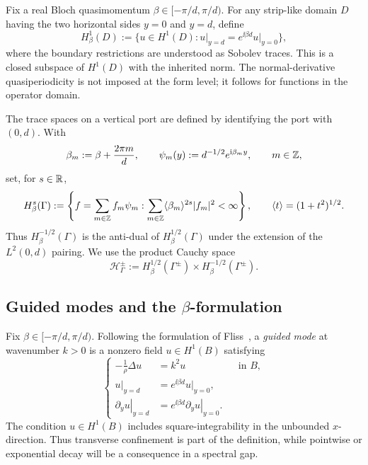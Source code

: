 Fix a real Bloch quasimomentum $\beta\in[-\pi/d,\pi/d)$.  For any strip-like
domain $D$ having the two horizontal sides $y=0$ and $y=d$, define
\begin{equation}
  H^1_\beta(D):=
  \bigl\{u\in H^1(D):
  \left.u\right|_{y=d}
  =e^{\ii\beta d}\left.u\right|_{y=0}\bigr\},
  \label{eq:H1beta}
\end{equation}
where the boundary restrictions are understood as Sobolev traces.  This is a
closed subspace of $H^1(D)$ with the inherited norm.  The normal-derivative
quasiperiodicity is not imposed at the form level; it follows for functions in
the operator domain.

The trace spaces on a vertical port are defined by identifying the port with
$(0,d)$.  With
\[
  \beta_m:=\beta+\frac{2\pi m}{d},\qquad
  \psi_m(y):=d^{-1/2}e^{\mathrm{i}\beta_my},\qquad m\in\mathbb{Z},
\]
set, for $s\in\mathbb{R}$,
\begin{equation}
  H^s_\beta(\Gamma):=
  \left\{f=\sum_{m\in\mathbb{Z}}f_m\psi_m:
  \sum_{m\in\mathbb{Z}}\langle\beta_m\rangle^{2s}|f_m|^2<\infty\right\},
  \qquad \langle t\rangle=(1+t^2)^{1/2}.
  \label{eq:port-Sobolev}
\end{equation}
Thus $H^{-1/2}_\beta(\Gamma)$ is the anti-dual of
$H^{1/2}_\beta(\Gamma)$ under the extension of the $L^2(0,d)$ pairing.  We use
the product Cauchy space
\begin{equation}
  \mathcal H_\Gamma^\pm
  :=H^{1/2}_\beta(\Gamma^\pm)\times H^{-1/2}_\beta(\Gamma^\pm).
  \label{eq:Cauchy-space}
\end{equation}

\subsection{Guided modes and the \texorpdfstring{$\beta$}{beta}-formulation}

Fix $\beta\in[-\pi/d,\pi/d)$.  Following the formulation of
Fliss~\cite[(2.4)]{Fliss2013}, a \emph{guided mode} at wavenumber $k>0$ is a
nonzero field $u\in H^1(B)$ satisfying
\begin{equation}
  \left\{
  \begin{aligned}
    -\frac{1}{\rho}\Delta u&=k^2u&&\text{in }B,\\
    \left.u\right|_{y=d}
      &=e^{\ii\beta d}\left.u\right|_{y=0},\\
    \left.\partial_yu\right|_{y=d}
      &=e^{\ii\beta d}\left.\partial_yu\right|_{y=0}.
  \end{aligned}
  \right.
  \label{eq:guided-mode-Fliss}
\end{equation}
The condition $u\in H^1(B)$ includes square-integrability in the unbounded
$x$-direction.  Thus transverse confinement is part of the definition, while
pointwise or exponential decay will be a consequence in a spectral gap.

